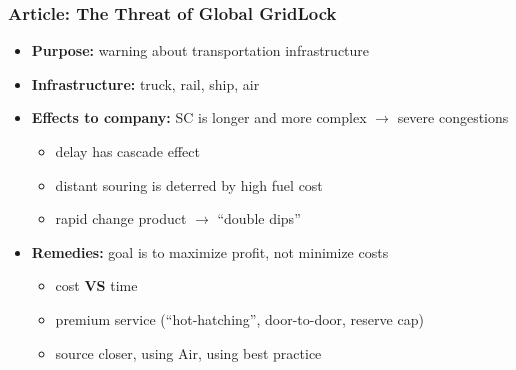 \documentclass[10pt,presentation]{beamer}
\begin{document}
\begin{frame}
  \frametitle{Article: The Threat of Global GridLock \forIE}

    \begin{itemize}
      \item \textbf{Purpose:} warning about transportation infrastructure
      \item \textbf{Infrastructure:} truck, rail, ship, air
      \item \textbf{Effects to company:} SC is longer and more complex $\rightarrow$ severe congestions
      \begin{itemize}
        \item delay has cascade effect
        \item distant souring is deterred by  high fuel cost
        \item rapid change product $\rightarrow$ ``double dips'' \NextHalfLine
      \end{itemize}
      \item \textbf{Remedies:} goal is to maximize profit, not minimize costs
      \begin{itemize}
        \item cost \textbf{VS} time
        \item premium service (``hot-hatching'', door-to-door, reserve cap)
        \item source closer, using Air, using best practice
      \end{itemize}
    \end{itemize}

  \end{frame}

\end{document}
